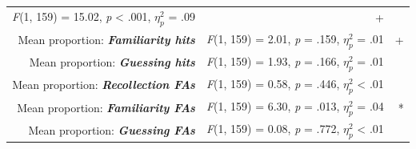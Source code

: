 \documentclass[
  11pt,
]{article}
\begin{document}
\begin{longtable}[]{@{}rrr@{}}
\begin{minipage}[t]{0.46\columnwidth}
\emph{F}(1, 159) = 15.02, \emph{p} \textless{} .001, \(\eta^2_p\) =
.09\strut
\end{minipage} & \begin{minipage}[t]{0.07\columnwidth}\raggedleft
+\strut
\end{minipage}\tabularnewline
\begin{minipage}[t]{0.38\columnwidth}\raggedleft
Mean proportion: \textbf{\emph{Familiarity hits}}\strut
\end{minipage} & \begin{minipage}[t]{0.46\columnwidth}\raggedleft
\emph{F}(1, 159) = 2.01, \emph{p} = .159, \(\eta^2_p\) = .01\strut
\end{minipage} & \begin{minipage}[t]{0.07\columnwidth}\raggedleft
+\strut
\end{minipage}\tabularnewline
\begin{minipage}[t]{0.38\columnwidth}\raggedleft
Mean proportion: \textbf{\emph{Guessing hits}}\strut
\end{minipage} & \begin{minipage}[t]{0.46\columnwidth}\raggedleft
\emph{F}(1, 159) = 1.93, \emph{p} = .166, \(\eta^2_p\) = .01\strut
\end{minipage} & \begin{minipage}[t]{0.07\columnwidth}\raggedleft
\strut
\end{minipage}\tabularnewline
\begin{minipage}[t]{0.38\columnwidth}\raggedleft
Mean proportion: \textbf{\emph{Recollection FAs}}\strut
\end{minipage} & \begin{minipage}[t]{0.46\columnwidth}\raggedleft
\emph{F}(1, 159) = 0.58, \emph{p} = .446, \(\eta^2_p\) \textless{}
.01\strut
\end{minipage} & \begin{minipage}[t]{0.07\columnwidth}\raggedleft
\strut
\end{minipage}\tabularnewline
\begin{minipage}[t]{0.38\columnwidth}\raggedleft
Mean proportion: \textbf{\emph{Familiarity FAs}}\strut
\end{minipage} & \begin{minipage}[t]{0.46\columnwidth}\raggedleft
\emph{F}(1, 159) = 6.30, \emph{p} = .013, \(\eta^2_p\) = .04\strut
\end{minipage} & \begin{minipage}[t]{0.07\columnwidth}\raggedleft
*\strut
\end{minipage}\tabularnewline
\begin{minipage}[t]{0.38\columnwidth}\raggedleft
Mean proportion: \textbf{\emph{Guessing FAs}}\strut
\end{minipage} & \begin{minipage}[t]{0.46\columnwidth}\raggedleft
\emph{F}(1, 159) = 0.08, \emph{p} = .772, \(\eta^2_p\) \textless{}
.01\strut
\end{minipage} & \begin{minipage}[t]{0.07\columnwidth}\raggedleft
\strut
\end{minipage}\tabularnewline
\bottomrule
\end{longtable}
\end{document}
